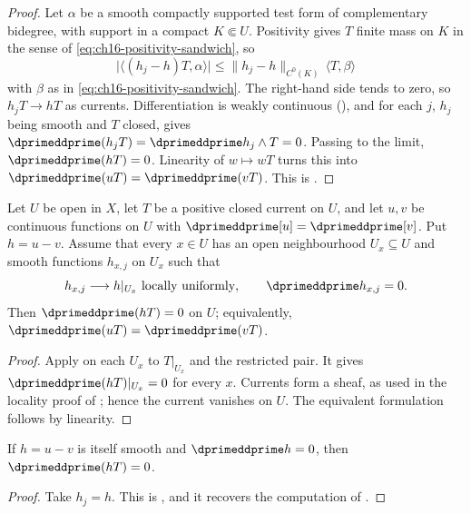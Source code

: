 \begin{proof}
Let $\alpha$ be a smooth compactly supported test form of complementary
bidegree, with support in a compact $K\Subset U$.  Positivity gives
$T$ finite mass on $K$ in the sense of \eqref{eq:ch16-positivity-sandwich},
so
\[
 \bigl|\langle(h_j-h)T,\alpha\rangle\bigr|
 \leq\|h_j-h\|_{C^0(K)}\,\langle T,\beta\rangle
\]
with $\beta$ as in \eqref{eq:ch16-positivity-sandwich}.  The right-hand side
tends to zero, so $h_jT\to hT$ as currents.  Differentiation is weakly
continuous (), and for each $j$,
$h_j$ being smooth and $T$ closed,
 gives
$\dprimeddprime(h_jT)=\dprimeddprime h_j\wedge T=0$.  Passing to the limit,
$\dprimeddprime(hT)=0$.  Linearity of $w\mapsto wT$ turns this into
$\dprimeddprime(uT)=\dprimeddprime(vT)$.  This is
.
\end{proof}

\begin{corollary}
\label{cor:ch16-local-pluriharmonic-criterion}
Let $U$ be open in $X$, let $T$ be a positive closed current on $U$, and let
$u,v$ be continuous functions on $U$ with
$\dprimeddprime[u]=\dprimeddprime[v]$.  Put $h=u-v$.  Assume that every
$x\in U$ has an open neighbourhood $U_x\subseteq U$ and smooth functions
$h_{x,j}$ on $U_x$ such that
\[
 h_{x,j}\longrightarrow h|_{U_x}\ \text{locally uniformly},
 \qquad \dprimeddprime h_{x,j}=0 .
\]
Then $\dprimeddprime(hT)=0$ on $U$; equivalently,
$\dprimeddprime(uT)=\dprimeddprime(vT)$.
\end{corollary}

\begin{proof}
Apply  on each $U_x$ to
$T|_{U_x}$ and the restricted pair.  It gives
$\dprimeddprime(hT)|_{U_x}=0$ for every $x$.  Currents form a sheaf, as
used in the locality proof of ; hence the
current vanishes on $U$.  The equivalent formulation follows by linearity.
\end{proof}

\begin{corollary}
\label{cor:ch16-smooth-h}
If $h=u-v$ is itself smooth and $\dprimeddprime h=0$, then
$\dprimeddprime(hT)=0$.
\end{corollary}

\begin{proof}
Take $h_j=h$.  This is , and it recovers the
computation of .
\end{proof}

